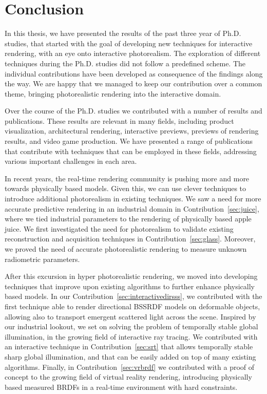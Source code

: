 \chapter{Conclusion}
In this thesis, we have presented the results of the past three year of Ph.D. studies, that started with the goal of developing new techniques for interactive rendering, with an eye onto interactive photorealism. The exploration of different techniques during the Ph.D. studies did not follow a predefined scheme. The individual contributions have been developed as consequence of the findings along the way. We are happy that we managed to keep our contribution over a common theme, bringing photorealistic rendering into the interactive domain.

Over the course of the Ph.D. studies we contributed with a number of results and publications. These results are relevant in many fields, including product visualization, architectural rendering, interactive previews, previews of rendering results, and video game production. We have presented a range of publications that contribute with techniques that can be employed in these fields, addressing various important challenges in each area. 

In recent years, the real-time rendering community is pushing more and more towards physically based models. Given this, we can use clever techniques to introduce additional photorealism in existing techniques. We saw a need for more accurate predictive rendering in an industrial domain in Contribution~\ref{sec:juice}, where we tied industrial parameters to the rendering of physically based apple juice. We first investigated the need for photorealism to validate existing reconstruction and acquisition techniques in Contribution~\ref{sec:glass}. Moreover, we proved the need of accurate photorealistic rendering to measure unknown radiometric parameters. 

After this excursion in hyper photorealistic rendering, we moved into developing techniques that improve upon existing algorithms to further enhance physically based models. In our Contribution~\ref{sec:interactivedirsss}, we contributed with the first technique able to render directional BSSRDF models on deformable objects, allowing also to transport emergent scattered light across the scene. Inspired by our industrial lookout, we set on solving the problem of temporally stable global illumination, in the growing field of interactive ray tracing. We contributed with an interactive technique in Contribution~\ref{sec:srt} that allows temporally stable sharp global illumination, and that can be easily added on top of many existing algorithms. Finally, in Contribution~\ref{sec:vrbrdf} we contributed with a proof of concept to the growing field of virtual reality rendering, introducing physically based measured BRDFs in a real-time environment with hard constraints.   

